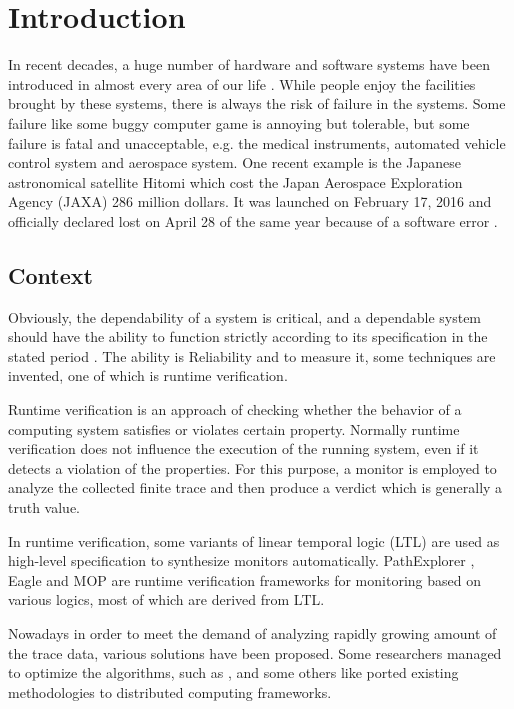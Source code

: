 
\chapter{Introduction}

In recent decades, a huge number of hardware and software systems have been introduced in almost every area of our life \citep{clarke1999model}. While people enjoy the facilities brought by these systems, there is always the risk of failure in the systems. Some failure like some buggy computer game is annoying but tolerable, but some failure is fatal and unacceptable, e.g. the medical instruments, automated vehicle control system and aerospace system. One recent example is the Japanese astronomical satellite Hitomi which cost the Japan Aerospace Exploration Agency (JAXA) 286 million dollars. It was launched on February 17, 2016 and officially declared lost on April 28 of the same year because of a software error \citep{nature2016}.

\section{Context}

Obviously, the dependability of a system is critical, and a dependable system should have the ability to function strictly according to its specification in the stated period \citep{avivzienis2004basic}. The ability is Reliability and to measure it, some techniques are invented, one of which is runtime verification.

Runtime verification \citep{leucker2009brief} is an approach of checking whether the behavior of a computing system satisfies or violates certain property. Normally runtime verification does not influence the execution of the running system, even if it detects a violation of the properties. For this purpose, a monitor is employed to analyze the collected finite trace and then produce a verdict which is generally a truth value.

In runtime verification, some variants of linear temporal logic (LTL) \citep{pnueli97} are used as high-level specification to synthesize monitors automatically. PathExplorer \citep{havelund2001java}, Eagle \citep{barringer2004rule} and MOP \citep{chen2007mop} are runtime verification frameworks for monitoring based on various logics, most of which are derived from LTL.

Nowadays in order to meet the demand of analyzing rapidly growing amount of the trace data, various solutions have been proposed. Some researchers managed to optimize the algorithms, such as \cite{havelund2001monitoring}, and some others like \cite{barre2012mapreduce} ported existing methodologies to distributed computing frameworks.

